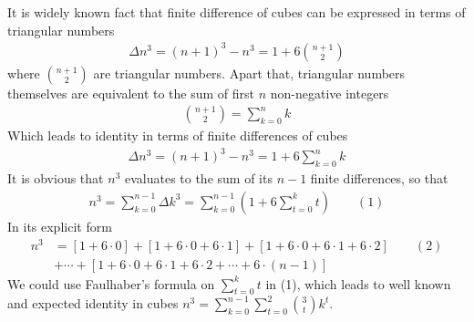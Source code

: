 It is widely known fact that finite difference of cubes can be expressed in terms of triangular numbers
\begin{align*}
    \Delta n^3 = (n+1)^3 - n^3 = 1 + 6 \binom{n+1}{2}
\end{align*}
where $\binom{n+1}{2}$ are triangular numbers.
Apart that, triangular numbers themselves are equivalent to the sum of first $n$ non-negative integers
\begin{align*}
    \binom{n+1}{2} = \sum_{k=0}^{n} k
\end{align*}
Which leads to identity in terms of finite differences of cubes
\begin{align*}
    \Delta n^3 = (n+1)^3 - n^3 = 1 + 6 \sum_{k=0}^{n} k
\end{align*}
It is obvious that $n^3$ evaluates to the sum of its $n-1$ finite differences, so that
\begin{align*}
    n^3 = \sum_{k=0}^{n-1} \Delta k^3 = \sum_{k=0}^{n-1} \left( 1 + 6 \sum_{t=0}^{k} t \right)
    \quad \quad (1)
\end{align*}
In its explicit form
\begin{align*}
    n^3 &= [1+6\cdot0]+[1+6\cdot0+6\cdot1]+[1+6\cdot0+6\cdot1+6\cdot2]  \quad \quad (2) \\
    &+ \cdots + [1+6\cdot0+6\cdot1+6\cdot2+\cdots+6\cdot(n-1)]
\end{align*}
We could use Faulhaber's formula on $\sum_{t=0}^{k} t$ in (1),
which leads to well known and expected identity in cubes $n^3 = \sum_{k=0}^{n-1} \sum_{t=0}^{2} \binom{3}{t} k^t$.

